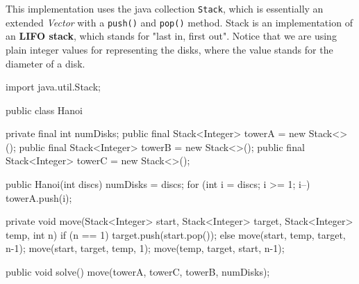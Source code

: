 \begin{impl}
This implementation uses the java collection \texttt{Stack}, which is essentially an extended \emph{Vector} with a \texttt{push()} and \texttt{pop()} method. Stack is an implementation of an \textbf{LIFO stack}, which stands for "last in, first out".
Notice that we are using plain integer values for representing the disks, where the value stands for the diameter of a disk.
\end{impl}

\begin{javacode}
import java.util.Stack;

public class Hanoi {
    private final int numDisks;
    public final Stack<Integer> towerA = new Stack<>();
    public final Stack<Integer> towerB = new Stack<>();
    public final Stack<Integer> towerC = new Stack<>();
    
    public Hanoi(int discs) {
        numDisks = discs;
        for (int i = discs; i >= 1; i--)
            towerA.push(i);
    }
    
    private void move(Stack<Integer> start, Stack<Integer> target, 
                      Stack<Integer> temp, int n) {
        if (n == 1) {
            target.push(start.pop());
        } else {
            move(start, temp, target, n-1);
            move(start, target, temp, 1);
            move(temp, target, start, n-1);
        }
    }
    
    public void solve() {
        move(towerA, towerC, towerB, numDisks);
    }
}
\end{javacode}
